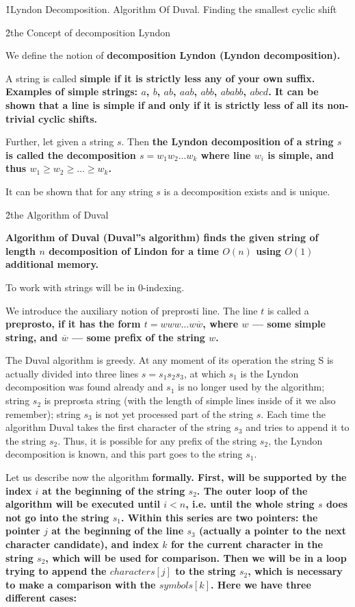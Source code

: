 \h1{Lyndon Decomposition. Algorithm Of Duval. Finding the smallest cyclic shift}


\h2{the Concept of decomposition Lyndon}

We define the notion of \bf{decomposition Lyndon} (Lyndon decomposition).

A string is called \bf{simple} if it is strictly \bf{less} any of your own \bf{suffix}. Examples of simple strings: $a$, $b$, $ab$, $aab$, $abb$, $ababb$, $abcd$. It can be shown that a line is simple if and only if it is strictly \bf{less} of all its non-trivial \bf{cyclic shifts}.

Further, let given a string $s$. Then \bf{the Lyndon decomposition} of a string $s$ is called the decomposition $s = w_1 w_2 \ldots w_k$ where line $w_i$ is simple, and thus $w_1 \ge w_2 \ge \ldots \ge w_k$.

It can be shown that for any string $s$ is a decomposition exists and is unique.


\h2{the Algorithm of Duval}

\bf{Algorithm of Duval} (Duval''s algorithm) finds the given string of length $n$ decomposition of Lindon for a time $O (n)$ using $O (1)$ additional memory.

To work with strings will be in 0-indexing.

We introduce the auxiliary notion of preprosti line. The line $t$ is called a \bf{preprosto}, if it has the form $t = w w w \ldots w \overline{w}$, where $w$ --- some simple string, and $\overline{w}$ --- some prefix of the string $w$.

The Duval algorithm is greedy. At any moment of its operation the string S is actually divided into three lines $s = s_1 s_2 s_3$, at which $s_1$ is the Lyndon decomposition was found already and $s_1$ is no longer used by the algorithm; string $s_2$ is preprosta string (with the length of simple lines inside of it we also remember); string $s_3$ is not yet processed part of the string $s$. Each time the algorithm Duval takes the first character of the string $s_3$ and tries to append it to the string $s_2$. Thus, it is possible for any prefix of the string $s_2$, the Lyndon decomposition is known, and this part goes to the string $s_1$.

Let us describe now the algorithm \bf{formally}. First, will be supported by the index $i$ at the beginning of the string $s_2$. The outer loop of the algorithm will be executed until $i < n$, i.e. until the whole string $s$ does not go into the string $s_1$. Within this series are two pointers: the pointer $j$ at the beginning of the line $s_3$ (actually a pointer to the next character candidate), and index $k$ for the current character in the string $s_2$, which will be used for comparison. Then we will be in a loop trying to append the $character s[j]$ to the string $s_2$, which is necessary to make a comparison with the $symbol s[k]$. Here we have three different cases:

